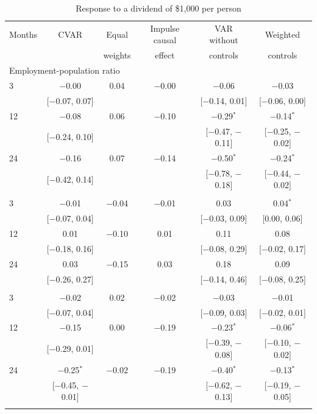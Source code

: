 \begin{table}[htbp]
\centering
\caption{Response to a dividend of \$1,000 per person\label{tab:ak-main}}
\footnotesize
\begin{tabular}{lccccc}
\toprule
Months & CVAR & Equal & Impulse causal & VAR without & Weighted \\
 & & weights & effect & controls & controls \\
\midrule
\multicolumn{6}{l}{Employment-population ratio} \\
3 & $-$0.00 & 0.04 & $-$0.00 & $-$0.06 & $-$0.03 \\
 & [$-$0.07, 0.07] & & & [$-$0.14, 0.01] & [$-$0.06, 0.00] \\
12 & $-$0.08 & 0.06 & $-$0.10 & $-$0.29$^{*}$ & $-$0.14$^{*}$ \\
 & [$-$0.24, 0.10] & & & [$-$0.47, $-$0.11] & [$-$0.25, $-$0.02] \\
24 & $-$0.16 & 0.07 & $-$0.14 & $-$0.50$^{*}$ & $-$0.24$^{*}$ \\
 & [$-$0.42, 0.14] & & & [$-$0.78, $-$0.18] & [$-$0.44, $-$0.02] \\
\addlinespace
\multicolumn{6}{l}{Unemployment rate} \\
3 & $-$0.01 & $-$0.04 & $-$0.01 & 0.03 & 0.04$^{*}$ \\
 & [$-$0.07, 0.04] & & & [$-$0.03, 0.09] & [0.00, 0.06] \\
12 & 0.01 & $-$0.10 & 0.01 & 0.11 & 0.08 \\
 & [$-$0.18, 0.16] & & & [$-$0.08, 0.29] & [$-$0.02, 0.17] \\
24 & 0.03 & $-$0.15 & 0.03 & 0.18 & 0.09 \\
 & [$-$0.26, 0.27] & & & [$-$0.14, 0.46] & [$-$0.08, 0.25] \\
\addlinespace
\multicolumn{6}{l}{Participation rate} \\
3 & $-$0.02 & 0.02 & $-$0.02 & $-$0.03 & $-$0.01 \\
 & [$-$0.07, 0.04] & & & [$-$0.09, 0.03] & [$-$0.02, 0.01] \\
12 & $-$0.15 & 0.00 & $-$0.19 & $-$0.23$^{*}$ & $-$0.06$^{*}$ \\
 & [$-$0.29, 0.01] & & & [$-$0.39, $-$0.08] & [$-$0.10, $-$0.02] \\
24 & $-$0.25$^{*}$ & $-$0.02 & $-$0.19 & $-$0.40$^{*}$ & $-$0.13$^{*}$ \\
 & [$-$0.45, $-$0.01] & & & [$-$0.62, $-$0.13] & [$-$0.19, $-$0.05] \\
\addlinespace
\multicolumn{6}{l}{Payroll employment} \\

\end{tabular}
\end{table}
